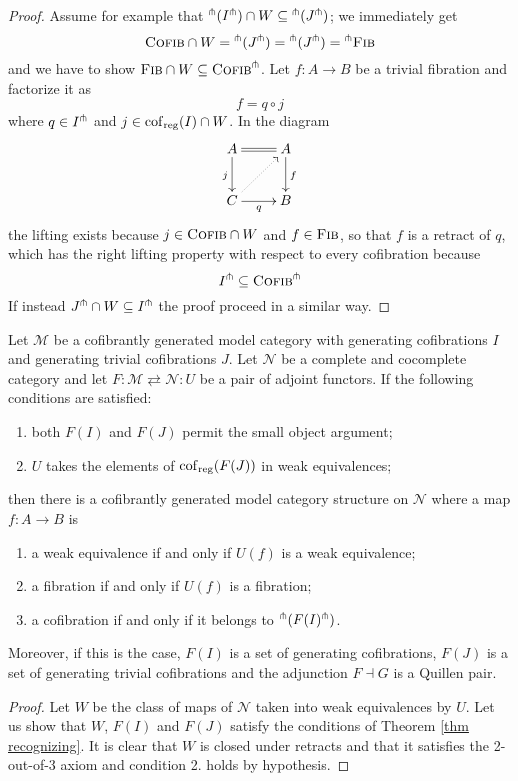 \begin{refsection}
\begin{proof}
Assume for example that ${}^{\pitchfork}(I^{\pitchfork}) \cap W \subseteq {}^{\pitchfork}(J^{\pitchfork})$; we immediately get
\[
\textsc{Cofib} \cap W = {}^{\pitchfork}(J^{\pitchfork}) = {}^{\pitchfork}(J^{\pitchfork}) = {}^{\pitchfork}\textsc{Fib}
\]
and we have to show $\textsc{Fib} \cap W \subseteq \textsc{Cofib}^{\pitchfork}$. Let $f \colon A \to B$ be a trivial fibration and factorize it as
\[
f = q \circ j
\]
where $q \in I^{\pitchfork}$ and $j \in \mathrm{cof}_{\mathrm{reg}}(I) \cap W$. In the diagram
\[
\xymatrix{
A \ar[d]_j \ar@{=}[r] & A \ar[d]^f \\ C \ar[r]_q \ar@{.>}[ur] & B
}
\]
the lifting exists because $j \in \textsc{Cofib} \cap W$ and $f \in \textsc{Fib}$, so that $f$ is a retract of $q$, which has the right lifting property with respect to every cofibration because
\[
I^{\pitchfork} \subseteq \textsc{Cofib}^{\pitchfork}
\]
If instead $J^{\pitchfork} \cap W \subseteq I^{\pitchfork}$ the proof proceed in a similar way.
\end{proof}

\begin{thm} \label{thm lifting}
Let $\mathcal M$ be a cofibrantly generated model category with generating cofibrations $I$ and generating trivial cofibrations $J$. Let $\mathcal N$ be a complete and cocomplete category and let $F \colon \mathcal M \rightleftarrows \mathcal N \colon U$ be a pair of adjoint functors. If the following conditions are satisfied:
\begin{enumerate}
\item both $F(I)$ and $F(J)$ permit the small object argument;
\item $U$ takes the elements of $\mathrm{cof}_{\mathrm{reg}}(F(J))$ in weak equivalences;
\end{enumerate}
then there is a cofibrantly generated model category structure on $\mathcal N$ where a map $f \colon A \to B$ is
\begin{enumerate}
\item a weak equivalence if and only if $U(f)$ is a weak equivalence;
\item a fibration if and only if $U(f)$ is a fibration;
\item a cofibration if and only if it belongs to ${}^{\pitchfork}(F(I)^{\pitchfork})$.
\end{enumerate}
Moreover, if this is the case, $F(I)$ is a set of generating cofibrations, $F(J)$ is a set of generating trivial cofibrations and the adjunction $F \dashv G$ is a Quillen pair.
\end{thm}

\begin{proof}
Let $W$ be the class of maps of $\mathcal N$ taken into weak equivalences by $U$. Let us show that $W$, $F(I)$ and $F(J)$ satisfy the conditions of Theorem \ref{thm recognizing}. It is clear that $W$ is closed under retracts and that it satisfies the 2-out-of-3 axiom and condition 2. holds by hypothesis.


\end{proof}
\end{refsection}
